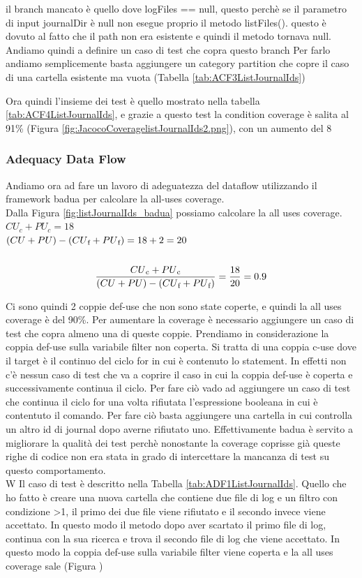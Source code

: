 \documentclass[12pt, a4paper]{article}
\begin{document}
il branch mancato è quello dove logFiles == null, questo perchè se il parametro di input journalDir
 è null non esegue proprio il metodo listFiles().
questo è dovuto al fatto che il path non era esistente e quindi il metodo tornava null.
Andiamo quindi a definire un caso di test che copra questo branch
Per farlo andiamo semplicemente basta aggiungere un category partition che copre il caso di una cartella esistente ma vuota
(Tabella \ref{tab:ACF3ListJournalIds})

Ora quindi l'insieme dei test è quello mostrato nella tabella \ref{tab:ACF4ListJournalIds}, 
e grazie a questo test la condition coverage è salita al 91\% (Figura \ref{fig:JacocoCoveragelistJournalIds2.png}),
con un aumento del 8%

 \subsubsection{Adequacy Data Flow}

 Andiamo ora ad fare un lavoro di adeguatezza del dataflow utilizzando il framework badua per calcolare la all-uses coverage. \\
Dalla Figura \ref{fig:listJournalIds_badua} possiamo calcolare la all uses coverage. \\
\(CU_c + PU_c = 18\) \\
\( (CU + PU) - (CU\textsubscript{f} + PU\textsubscript{f}) = 18 + 2 = 20\) \\ \\
\[\frac{{CU\textsubscript{c} + PU\textsubscript{c}}}{{(CU + PU) - (CU\textsubscript{f} + PU\textsubscript{f})}} = \frac{{18}}{{20}} = 0.9\]

Ci sono quindi 2 coppie def-use che non sono state coperte, e quindi la all uses coverage è del 90\%.
Per aumentare la coverage è necessario aggiungere un caso di test che copra almeno una di queste coppie.
Prendiamo in considerazione la coppia def-use sulla variabile filter non coperta. Si tratta di una coppia c-use 
dove il target è il continuo del ciclo for in cui è contenuto lo statement. In effetti non c'è nessun caso di test
che va a coprire il caso in cui la coppia def-use è coperta e successivamente continua il ciclo.
Per fare ciò vado ad aggiungere un caso di test che continua il ciclo for una volta rifiutata 
l'espressione booleana in cui è contentuto il comando. Per fare ciò basta aggiungere una cartella in cui controlla
un altro id di journal dopo averne rifiutato uno. Effettivamente badua è servito a migliorare la qualità dei 
test perchè nonostante la coverage
coprisse già queste righe di codice non era stata in grado di intercettare la mancanza
di test su questo comportamento. \\W
Il caso di test è descritto nella Tabella \ref{tab:ADF1ListJournalIds}. Quello che ho fatto è creare una nuova
cartella che contiene due file di log e un filtro con condizione >1, il primo dei due file viene rifiutato 
e il secondo invece viene accettato. In questo modo il metodo dopo aver scartato il primo file di log, continua
con la sua ricerca e trova il secondo file di log che viene accettato. In questo modo la coppia
def-use sulla variabile filter viene coperta e la all uses coverage sale (Figura )
\end{document}
